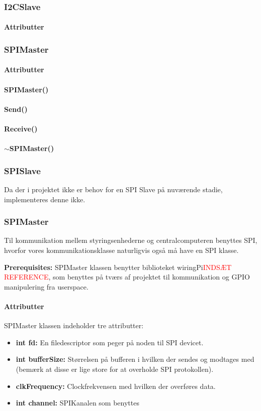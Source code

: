 \subsubsection{I2CSlave}
\paragraph{Attributter}
\subsubsection{SPIMaster}
\paragraph{Attributter}
\paragraph{SPIMaster()}
\paragraph{Send()}
\paragraph{Receive()}
\paragraph{$\sim$SPIMaster()}


\subsubsection{SPISlave}
Da der i projektet ikke er behov for en SPI Slave på nuværende stadie, implementeres denne ikke. 

\subsubsection{SPIMaster}
Til kommunikation mellem styringsenhederne og centralcomputeren benyttes SPI, hvorfor vores kommunikationsklasse naturligvis også må have en SPI klasse. 

\textbf{Prerequisites:}
SPIMaster klassen benytter biblioteket wiringPi\textcolor{red}{INDSÆT REFERENCE}, som benyttes på tværs af projektet til kommunikation og GPIO manipulering fra userspace. 
\paragraph{Attributter}
SPIMaster klassen indeholder tre attributter:
\begin{itemize}
    \item \textbf{int fd:} En filedescriptor som peger på noden til SPI devicet. 
    \item \textbf{int bufferSize:} Størrelsen på bufferen i hvilken der sendes og modtages med (bemærk at disse er lige store for at overholde SPI protokollen). 
    \item \textbf{clkFrequency:} Clockfrekvensen med hvilken der overføres data. 
    \item \textbf{int channel:} SPIKanalen som benyttes
\end{itemize}
